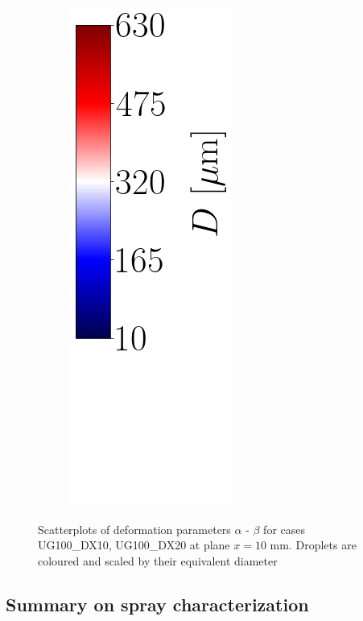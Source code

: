 \begin{figure}[ht]
\begin{subfigure}[b]{0.4\textwidth}
\end{subfigure}
\begin{subfigure}[b]{0.1\textwidth}
	\centering
	\hspace*{0.35in}
   \includegraphics[scale=0.4]{./part2_developments/figures_ch5_resolved_JICF/SPRAY_characterization/deformation/scatterplots_colorbar_D_with_blank_space.png}
\end{subfigure}
   \caption[Scatterplots of deformation parameters $\alpha$ - $\beta$ for cases UG100\_DX10, UG100\_DX20 at plane $x = 10$ mm]{Scatterplots of deformation parameters $\alpha$ - $\beta$ for cases UG100\_DX10, UG100\_DX20 at plane $x = 10$ mm. Droplets are coloured and scaled by their equivalent diameter}
\label{fig:jicf_global_scatterplots_deformation}
\end{figure}



\subsection{Summary on spray characterization}

